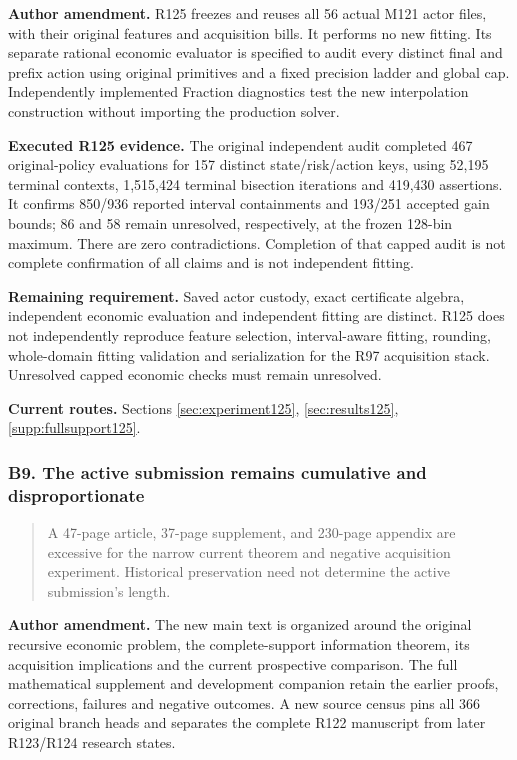 \noindent\textbf{Author amendment.} R125 freezes and reuses all 56 actual M121 actor files, with their original features and acquisition bills. It performs no new fitting. Its separate rational economic evaluator is specified to audit every distinct final and prefix action using original primitives and a fixed precision ladder and global cap. Independently implemented Fraction diagnostics test the new interpolation construction without importing the production solver.

\noindent\textbf{Executed R125 evidence.} The original independent audit completed 467 original-policy evaluations for 157 distinct state/risk/action keys, using 52,195 terminal contexts, 1,515,424 terminal bisection iterations and 419,430 assertions. It confirms 850/936 reported interval containments and 193/251 accepted gain bounds; 86 and 58 remain unresolved, respectively, at the frozen 128-bin maximum. There are zero contradictions. Completion of that capped audit is not complete confirmation of all claims and is not independent fitting.

\noindent\textbf{Remaining requirement.} Saved actor custody, exact certificate algebra, independent economic evaluation and independent fitting are distinct. R125 does not independently reproduce feature selection, interval-aware fitting, rounding, whole-domain fitting validation and serialization for the R97 acquisition stack. Unresolved capped economic checks must remain unresolved.

\noindent\textbf{Current routes.} Sections \ref{sec:experiment125}, \ref{sec:results125}, \ref{supp:fullsupport125}.

\subsubsection{B9. The active submission remains cumulative and disproportionate}

\begin{quote}\small
A 47-page article, 37-page supplement, and 230-page appendix are excessive for the narrow current theorem and negative acquisition experiment. Historical preservation need not determine the active submission's length.
\end{quote}

\noindent\textbf{Author amendment.} The new main text is organized around the original recursive economic problem, the complete-support information theorem, its acquisition implications and the current prospective comparison. The full mathematical supplement and development companion retain the earlier proofs, corrections, failures and negative outcomes. A new source census pins all 366 original branch heads and separates the complete R122 manuscript from later R123/R124 research states.

